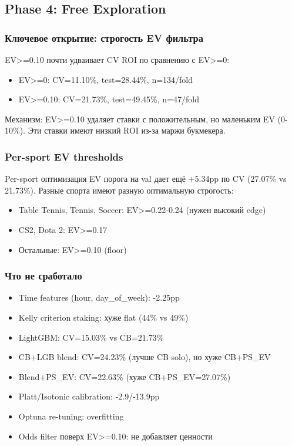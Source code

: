 \documentclass[12pt,a4paper]{article}
\begin{document}
\subsection{Phase 4: Free Exploration}

\subsubsection{Ключевое открытие: строгость EV фильтра}
EV>=0.10 почти удваивает CV ROI по сравнению с EV>=0:
\begin{itemize}
  \item EV>=0: CV=11.10\%, test=28.44\%, n=134/fold
  \item EV>=0.10: CV=21.73\%, test=49.45\%, n=47/fold
\end{itemize}

Механизм: EV>=0.10 удаляет ставки с положительным, но маленьким EV (0-10\%).
Эти ставки имеют низкий ROI из-за маржи букмекера.

\subsubsection{Per-sport EV thresholds}
Per-sport оптимизация EV порога на val дает ещё +5.34pp по CV (27.07\% vs 21.73\%).
Разные спорта имеют разную оптимальную строгость:
\begin{itemize}
  \item Table Tennis, Tennis, Soccer: EV>=0.22-0.24 (нужен высокий edge)
  \item CS2, Dota 2: EV>=0.17
  \item Остальные: EV>=0.10 (floor)
\end{itemize}

\subsubsection{Что не сработало}
\begin{itemize}
  \item Time features (hour, day\_of\_week): -2.25pp
  \item Kelly criterion staking: хуже flat (44\% vs 49\%)
  \item LightGBM: CV=15.03\% vs CB=21.73\%
  \item CB+LGB blend: CV=24.23\% (лучше CB solo), но хуже CB+PS\_EV
  \item Blend+PS\_EV: CV=22.63\% (хуже CB+PS\_EV=27.07\%)
  \item Platt/Isotonic calibration: -2.9/-13.9pp
  \item Optuna re-tuning: overfitting
  \item Odds filter поверх EV>=0.10: не добавляет ценности
\end{itemize}
\end{document}
